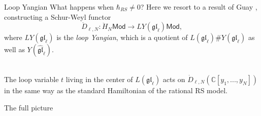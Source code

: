 \documentclass[11pt]{beamer}
\theoremstyle{remark}
\theoremstyle{remark}
\newcommand{\C}{\mathbb{C}}
\begin{document}
\begin{frame}{Loop Yangian}
What happens when $\hbar_{RS} \neq 0$? Here we resort to a result of Guay \cite{article:guay:2005}, constructing a Schur-Weyl functor
\begin{equation*}
\dot D_{\ell,N}: \ddot H_N\mathsf{Mod} \to LY(\mathfrak{gl}_\ell)\mathsf{Mod},
\end{equation*}
where $LY(\mathfrak{gl}_\ell)$ is the \emph{loop Yangian}, which is a quotient of $L(\mathfrak{gl}_\ell) \# Y(\mathfrak{gl}_\ell)$ as well as $Y(\widehat{\mathfrak{gl}}_\ell)$.
\\~\\
\begin{theorem}
The loop variable $t$ living in the center of $L(\mathfrak{gl}_\ell)$ acts on $\dot D_{\ell,N}(\C[y_1,...,y_N])$ in the same way as the standard Hamiltonian of the rational RS model.
\end{theorem}
\end{frame}

\begin{frame}[fragile]{The full picture}
\begin{center}
\end{center}
\end{frame}
\end{document}

